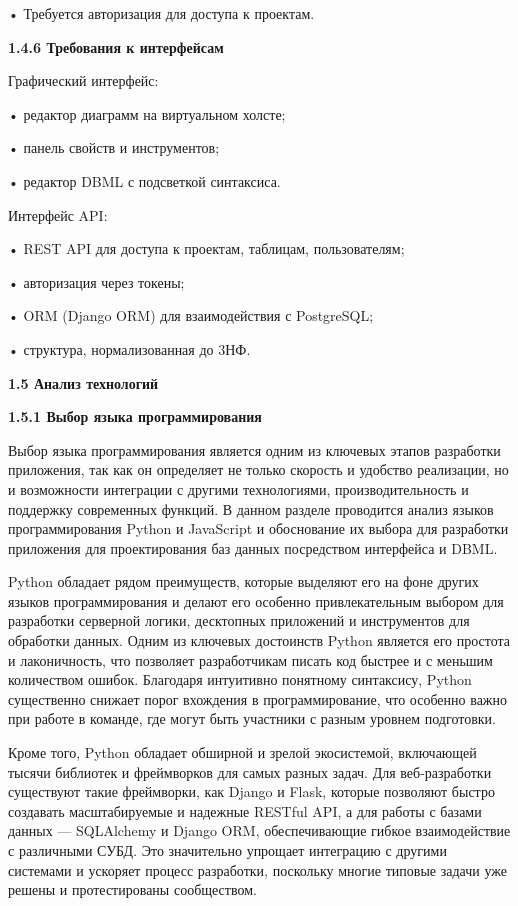 	•	Требуется авторизация для доступа к проектам.


\textbf{1.4.6 Требования к интерфейсам}

	Графический интерфейс:
    
	•	редактор диаграмм на виртуальном холсте;
    
	•	панель свойств и инструментов;
    
	•	редактор DBML с подсветкой синтаксиса.
    
	Интерфейс API:
    
	•	REST API для доступа к проектам, таблицам, пользователям;
    
	•	авторизация через токены;
    
	•	ORM (Django ORM) для взаимодействия с PostgreSQL;
    
	•	структура, нормализованная до 3НФ.


\textbf{1.5 Анализ технологий}

\textbf{1.5.1 Выбор языка программирования}

Выбор языка программирования является одним из ключевых этапов
разработки приложения, так как он определяет не только скорость и удобство
реализации, но и возможности интеграции с другими технологиями, производительность и поддержку современных функций. В данном разделе проводится анализ языков программирования Python и JavaScript и обоснование их выбора для разработки приложения для проектирования баз данных посредством интерфейса и DBML.

Python обладает рядом преимуществ, которые выделяют его на фоне других языков программирования и делают его особенно привлекательным выбором для разработки серверной логики, десктопных приложений и инструментов для обработки данных. Одним из ключевых достоинств Python является его простота и лаконичность, что позволяет разработчикам писать код быстрее и с меньшим количеством ошибок. Благодаря интуитивно понятному синтаксису, Python существенно снижает порог вхождения в программирование, что особенно важно при работе в команде, где могут быть участники с разным уровнем подготовки.

Кроме того, Python обладает обширной и зрелой экосистемой, включающей тысячи библиотек и фреймворков для самых разных задач. Для веб-разработки существуют такие фреймворки, как Django и Flask, которые позволяют быстро создавать масштабируемые и надежные RESTful API, а для работы с базами данных — SQLAlchemy и Django ORM, обеспечивающие гибкое взаимодействие с различными СУБД. Это значительно упрощает интеграцию с другими системами и ускоряет процесс разработки, поскольку многие типовые задачи уже решены и протестированы сообществом.

